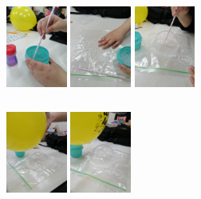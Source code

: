 \documentclass[]{article}
\newenvironment{Figura}
  {\par\medskip\noindent\minipage{\linewidth}}
  {\endminipage\par\medskip}
\begin{document}
\begin{multicols*}{2}
\begin{Figura}
    \centering
    \includegraphics[width=2cm, height=3cm]{imag/Exp2_00.jpg}
    \includegraphics[width=2cm, height=3cm]{imag/Exp2_01.jpg}
    \includegraphics[width=2cm, height=3cm]{imag/Exp2_02.jpg}
\end{Figura}  

\begin{Figura}
    \centering
    \includegraphics[width=2cm, height=3cm]{imag/Exp2_03.jpg}
    \includegraphics[width=2cm, height=3cm]{imag/Exp2_04.jpg}
\end{Figura}   





    

\end{multicols*}
\end{document}
